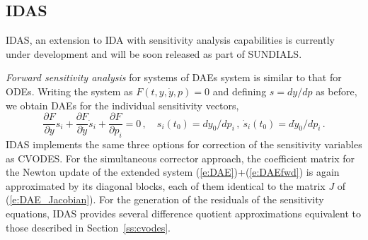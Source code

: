 
\subsection{IDAS}\label{ss:idas}

IDAS, an extension to IDA with sensitivity analysis capabilities is 
currently under development and will be soon released as part of SUNDIALS.

{\em Forward sensitivity analysis} for systems of DAEs system is similar to that 
for ODEs.  Writing the system as $F(t,y,\dot{y},p)=0$ and defining 
$s={dy}/{dp}$ as before, we obtain DAEs for the individual sensitivity vectors,
%
\begin{equation}\label{e:DAEfwd}
  \frac{\partial F}{\partial y} s_i + \frac{\partial F}{\partial \dot{y}} \dot{s}_i
  + \frac{\partial F}{\partial p_i}  = 0 \, , \quad
  s_i(t_0) = dy_0 / dp_i \, , ~ \dot{s}_i(t_0) = d\dot{y}_0 / dp_i \, .
\end{equation}
%
IDAS implements the same three options for correction of the sensitivity
variables as CVODES. For the simultaneous corrector approach, the coefficient
matrix for the Newton update of the extended system (\ref{e:DAE})+(\ref{e:DAEfwd})
is again approximated by its diagonal blocks, each of them identical to the
matrix $J$ of (\ref{e:DAE_Jacobian}). For the generation of the residuals of the sensitivity
equations, IDAS provides several difference quotient approximations equivalent 
to those described in Section~\ref{ss:cvodes}.

